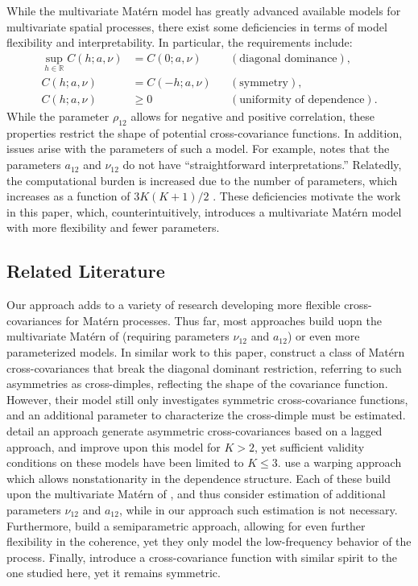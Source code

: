 \documentclass[11pt]{article}
\begin{document}
While the multivariate Mat\'ern model has greatly advanced available models for multivariate spatial processes, there exist some deficiencies in terms of model flexibility and interpretability. In particular, the requirements include:\begin{align*}
\sup_{h \in \mathbb{R}} C( h ; a,\nu) &= C(0; a, \nu) & & (\textrm{diagonal dominance}),\\ 
C( h ; a,\nu) &= C(-h; a, \nu) & &(\textrm{symmetry}), \\ 
C( h ; a,\nu) &\geq 0 & & (\textrm{uniformity of dependence}).
\end{align*}While the parameter $\rho_{12}$ allows for negative and positive correlation, these properties restrict the shape of potential cross-covariance functions. 
In addition, issues arise with the parameters of such a model. For example, \cite{kleiber_coherence_2018} notes that the parameters $a_{12}$ and $\nu_{12}$ do not have ``straightforward interpretations.'' Relatedly, the computational burden is increased due to the number of parameters, which increases as a function of $3K(K+1)/2$ \citep{guinness_nonparametric_2018}. These deficiencies motivate the work in this paper, which, counterintuitively, introduces a multivariate Mat\'ern model with more flexibility and fewer parameters.

\subsection{Related Literature}

Our approach adds to a variety of research developing more flexible cross-covariances for Mat\'ern processes. Thus far, most approaches build uopn the multivariate Mat\'ern of \cite{gneiting_matern_2010} (requiring parameters $\nu_{12}$ and $a_{12}$) or even more parameterized models.
In similar work to this paper, \cite{alegria_bivariate_2021} construct a class of Mat\'ern cross-covariances that break the diagonal dominant restriction, referring to such asymmetries as cross-dimples, reflecting the shape of the covariance function. However, their model still only investigates symmetric cross-covariance functions, and an additional parameter to characterize the cross-dimple must be estimated.
\cite{li_approach_2011} detail an approach generate asymmetric cross-covariances based on a lagged approach, and \cite{qadir_flexible_2020} improve upon this model for $K > 2$, yet sufficient validity conditions on these models have been limited to $K \leq 3$. \cite{vu_modeling_2020} use a warping approach which allows nonstationarity in the dependence structure. Each of these build upon the multivariate Mat\'ern of \cite{gneiting_matern_2010}, and thus consider estimation of additional parameters $\nu_{12}$ and $a_{12}$, while in our approach such estimation is not necessary. Furthermore, \cite{qadir_semiparametric_2021} build a semiparametric approach, allowing for even further flexibility in the coherence, yet they only model the low-frequency behavior of the process. Finally, \cite{bolin_multivariate_nodate} introduce a cross-covariance function with similar spirit to the one studied here, yet it remains symmetric. 
\end{document}
